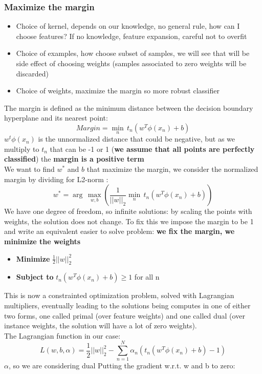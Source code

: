 \subsubsection{Maximize the margin}
    \begin{itemize}
        \item Choice of kernel, depends on our knowledge, no general rule, how can I choose features? If no knowledge, feature expansion, careful not to overfit
        \item Choice of examples, how choose subset of samples, we will see that will be side effect of choosing weights (samples associated to zero weights will be discarded)
        \item Choice of weights, maximize the margin so more robust classifier
    \end{itemize}
    The margin is defined as the minimum distance between the decision boundary hyperplane and its nearest point:
    $$Margin=\min_n\,t_n(w^T\phi(x_n)+b)$$
    $w^t\phi(x_n)$ is the unnormalized distance that could be negative, but as we multiply to $t_n$ that can be -1 or 1 (\textbf{we assume that all points are perfectly classified}) the \textbf{margin is a positive term}\\
    We want to find $w^*$ and $b$ that maximize the margin, we consider the normalized margin by dividing for L2-norm :
    $$w^*=\arg\,\max_{w,b}\left(\frac{1}{||w||_2}\min_n\,t_n(w^T\phi(x_n)+b)\right)$$
    We have one degree of freedom, so infinite solutions: by scaling the points with weights, the solution does not change. To fix this we impose the margin to be 1 and write an equivalent easier to solve problem: \textbf{we fix the margin, we minimize the weights}
    \begin{itemize}
        \item \textbf{Minimize} $\frac{1}{2}||w||^2_2$
        \item \textbf{Subject to} $t_n(w^T\phi(x_n)+b) \geq 1$ for all n
    \end{itemize}
    This is now a constrainted optimization problem, solved with Lagrangian multipliers, eventually leading to the solutions being computes in one of either two forms, one called primal (over feature weights) and one called dual (over instance weights, the solution will have a lot of zero weights).\\
    The Lagrangian function in our case:
    $$L(w,b,\alpha)=\frac{1}{2}||w||^2_2-\sum_{n=1}^N\alpha_n(t_n(w^T\phi(x_n)+b)-1)$$
    $\alpha$, so we are considering dual
    Putting the gradient w.r.t. w and b to zero:
